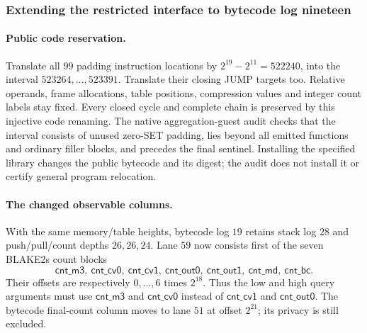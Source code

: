 \subsubsection{Extending the restricted interface to bytecode log nineteen}

\paragraph{Public code reservation.} Translate all $99$ padding instruction locations by $2^{19}-2^{11}=522240$, into the interval $523264,\ldots,523391$. Translate their closing JUMP targets too. Relative operands, frame allocations, table positions, compression values and integer count labels stay fixed. Every closed cycle and complete chain is preserved by this injective code renaming. The native aggregation-guest audit checks that the interval consists of unused zero-SET padding, lies beyond all emitted functions and ordinary filler blocks, and precedes the final sentinel. Installing the specified library changes the public bytecode and its digest; the audit does not install it or certify general program relocation.

\paragraph{The changed observable columns.} With the same memory/table heights, bytecode log $19$ retains stack log $28$ and push/pull/count depths $26,26,24$. Lane $59$ now consists first of the seven BLAKE2s count blocks
\[
 \mathsf{cnt\_m3},\ \mathsf{cnt\_cv0},\ \mathsf{cnt\_cv1},\
 \mathsf{cnt\_out0},\ \mathsf{cnt\_out1},\ \mathsf{cnt\_md},\ \mathsf{cnt\_bc}.
\]
Their offsets are respectively $0,\ldots,6$ times $2^{18}$. Thus the low and high query arguments must use $\mathsf{cnt\_m3}$ and $\mathsf{cnt\_cv0}$ instead of $\mathsf{cnt\_cv1}$ and $\mathsf{cnt\_out0}$. The bytecode final-count column moves to lane $51$ at offset $2^{21}$; its privacy is still excluded.

